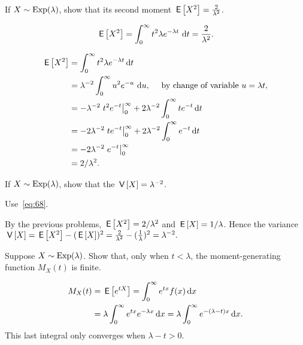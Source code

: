 \begin{exercise} 
 If $X\sim\operatorname{Exp}(\lambda)$, show that its second moment $\,\mathsf{E}\left[X^2\right] = \frac{2}{\lambda^2}$.
\begin{hint}
 \begin{equation*}
 \,\mathsf{E}\left[X^2\right]= \int_0^\infty t^2 \lambda e^{-\lambda t}\, \,\text{d}t = \frac{2}{\lambda^2}.
 \end{equation*}
\end{hint}
\begin{solution}
 \begin{align*}
\,\mathsf{E}\left[X^2\right] 
&= \int_0^\infty t^2 \lambda e^{-\lambda t} \,\text{d}t \\
&= \lambda^{-2} \int_0^\infty u^2 e^{-u}\, \,\text{d}u, \quad \text{ by change of variable $u=\lambda t$}, \\
&= -\lambda^{-2}\left. t^2 e^{- t}\right|_0^\infty + 2\lambda^{-2}\int_0^\infty t e^{- t} \,\text{d}t \\
&= -2\lambda^{-2}\left. t e^{- t}\right|_0^\infty + 2\lambda^{-2} \int_0^\infty e^{- t} \,\text{d}t\\
&= - 2\lambda^{-2} \left. e^{- t} \right|_0^\infty \\
&= 2/\lambda^2.
 \end{align*}
\end{solution}
\end{exercise}


\begin{extra}
 If $X\sim\operatorname{Exp}(\lambda)$, show that the 
$\,\mathsf{V}\left[X\right] = \lambda^{-2}$.
\begin{hint} Use~\cref{eq:68}. 
\end{hint}
\begin{solution}
 By the previous problems, $\,\mathsf{E}\left[X^2\right]=2/\lambda^2$ and $\,\mathsf{E}\left[X\right] = 1/\lambda$. Hence the variance $\,\mathsf{V}\left[X\right] = \,\mathsf{E}\left[X^2\right] - (\,\mathsf{E}\left[X\right])^2 = \frac{2}{\lambda^2} - (\frac{1}{\lambda})^2 = \lambda^{-2}.$
\end{solution}
\end{extra}


\begin{extra}
 Suppose $X\sim\operatorname{Exp}(\lambda)$. Show that, only when $t < \lambda$, the moment-generating function $M_X(t)$ is finite.
\begin{solution} 
  \begin{align*}
    M_X(t) &= \,\mathsf{E}\left[e^{t X}\right] = \int_0^\infty e^{t x} f(x) \,\text{d}x \\
    &= \lambda \int_0^\infty e^{t x} e^{-\lambda x} \,\text{d}x = \lambda \int_0^\infty  e^{-(\lambda -t) x} \,\text{d}x.
  \end{align*}
This last integral only converges when $\lambda -t > 0$. 
\end{solution}
\end{extra}

